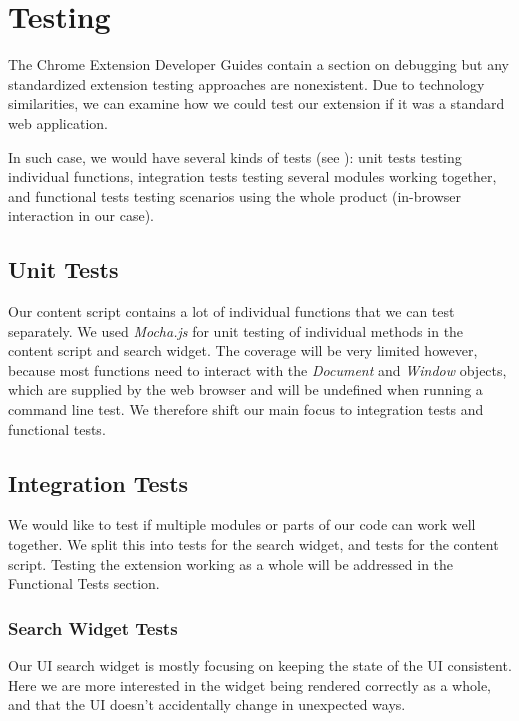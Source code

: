 \documentclass[bsc,frontabs,twoside,singlespacing,parskip,deptreport]{infthesis}
\begin{document}


\section{Testing}
The Chrome Extension Developer Guides contain a section on debugging \cite{C3} but any standardized extension testing approaches are nonexistent. Due to technology similarities, we can examine how we could test our extension if it was a standard web application.

In such case, we would have several kinds of tests (see \cite{A11}): unit tests testing individual functions, integration tests testing several modules working together, and functional tests testing scenarios using the whole product (in-browser interaction in our case).

\subsection{Unit Tests}
Our content script contains a lot of individual functions that we can test separately. We used \textit{Mocha.js} \cite{A12} for unit testing of individual methods in the content script and search widget. The coverage will be very limited however, because most functions need to interact with the \textit{Document} and \textit{Window} objects, which are supplied by the web browser and will be undefined when running a command line test. We therefore shift our main focus to integration tests and functional tests.

\subsection{Integration Tests}
We would like to test if multiple modules or parts of our code can work well together. We split this into tests for the search widget, and tests for the content script. Testing the extension working as a whole will be addressed in the Functional Tests section.

\subsubsection{Search Widget Tests}
Our UI search widget is mostly focusing on keeping the state of the UI consistent. Here we are more interested in the widget being rendered correctly as a whole, and that the UI doesn't accidentally change in unexpected ways.
\end{document}
